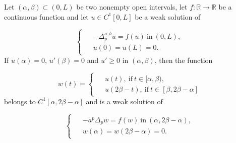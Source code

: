 \documentclass[10pt,a4paper]{amsart}
\newcommand{\R}{\mathbb{R}}
\begin{document}
\begin{lema} \label{L1} Let $(\alpha,\beta) \subset (0, L)$ be two nonempty open intervals, let $f : \R \rightarrow \R$ be a continuous function and let $u \in C^{1}[0,L]$ be a weak solution of

\begin{equation*}
\begin{cases}
\begin{aligned}
& - \Delta_{p}^{a,b} u = f(u) \ \text{in} \ (0,L), \\
& u(0) = u(L) = 0.
\end{aligned}
\end{cases}
\end{equation*}
If $u(\alpha) = 0$, $u'(\beta) = 0$ and $u' \geq 0$ in $(\alpha,\beta)$, then the function

\begin{equation*}
w(t) =
\begin{cases}
\begin{aligned}
     & u(t), \ \text{if} \ t \in [\alpha,\beta), \\
     & u(2\beta - t), \ \text{if} \ t \in [\beta,2\beta - \alpha]
\end{aligned}
\end{cases}
\end{equation*}
belongs to $C^1[\alpha, 2 \beta - \alpha]$ and is a weak solution of

\begin{equation*}
\begin{cases}
\begin{aligned}
& -a^{p}\Delta_{p} w = f(w) \ \text{in} \ (\alpha, 2\beta - \alpha), \\
& w(\alpha) = w(2\beta - \alpha) = 0.
\end{aligned}
\end{cases}
\end{equation*}
\end{lema}
\end{document}

